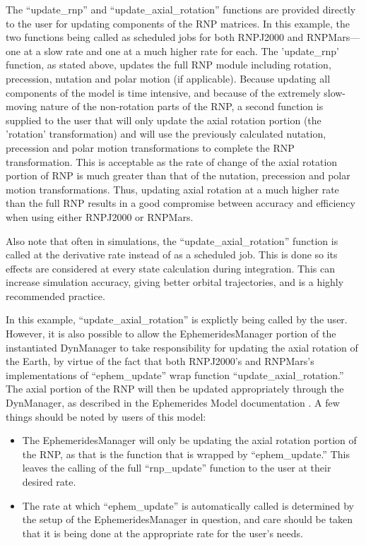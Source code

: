 The ``update\_rnp'' and ``update\_axial\_rotation'' functions are provided
directly to the user for updating components of the RNP matrices. In this
example, the two functions being called as scheduled jobs for both RNPJ2000
and RNPMars---one at a slow rate and one at a much higher rate for each.
The 'update\_rnp' function, as stated above, updates the full RNP module
including rotation, precession, nutation and polar motion (if applicable).
Because updating all components of the model is
time intensive, and because of the extremely slow-moving nature of the
non-rotation parts of the RNP, a second function is supplied
to the user that will only update the axial rotation portion (the 'rotation'
transformation) and will use the previously calculated nutation, precession
and polar motion transformations to complete the RNP transformation. This is
acceptable as the rate of change of the axial rotation portion of RNP is
much greater than that of the nutation, precession and polar motion
transformations. Thus, updating axial rotation at a much higher rate than the
full RNP results in a good compromise between accuracy and efficiency when
using either RNPJ2000 or RNPMars.

Also note that often in simulations, the ``update\_axial\_rotation'' function
is called at the derivative rate instead of as a scheduled job. This is done
so its effects are considered at every state calculation during integration.
This can increase simulation accuracy, giving better orbital trajectories, and
is a highly recommended practice.

In this example, ``update\_axial\_rotation'' is explictly being called
by the user. However, it is also possible to allow the EphemeridesManager
portion of the instantiated DynManager to take responsibility for
updating the axial rotation of the Earth, by virtue of the fact
that both RNPJ2000's and RNPMars's implementations of ``ephem\_update'' wrap
function ``update\_axial\_rotation.''
The axial portion of the RNP will then be updated appropriately through
the DynManager, as described in the Ephemerides Model documentation
\cite{dynenv:EPHEMERIDES}. A few things should be noted by users of this model:

\begin{itemize}
\item{The EphemeridesManager will only be updating the axial rotation portion
of the RNP, as that is the function that is wrapped by ``ephem\_update.'' This
leaves the calling of the full ``rnp\_update'' function to the user at
their desired rate.}
\item{The rate at which ``ephem\_update'' is automatically called is determined
by the setup of the EphemeridesManager in question, and care should
be taken that it is being done at the appropriate rate for the user's needs.}
\end{itemize}

